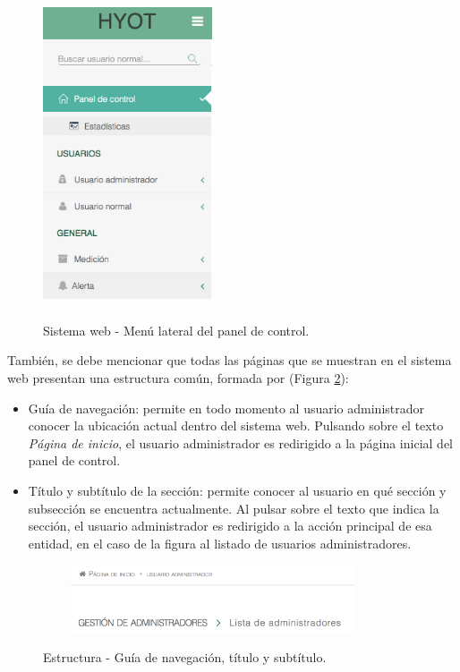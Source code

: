 \documentclass[12pt,a4paper, twoside]{report}
\begin{document}
\begin{itemize}
\begin{itemize}
			 	\begin{figure}[!ht]   
					\caption{Sistema web - Menú lateral del panel de control.} 
					\begin{center} 
	 					\includegraphics[width=5cm, height=9cm]{Images/userGuide/web/adminMenuLateral} \\
						\label{fig:web_adminMenuLateral} 
					\end{center}  	
				\end{figure}
			\end{itemize}
	\end{itemize}
	
	
	También, se debe mencionar que todas las páginas que se muestran en el sistema web presentan una estructura común, formada por (Figura \ref{fig:web_breadcrumb}): 
	
	\begin{itemize}
		\item Guía de navegación: permite en todo momento al usuario administrador conocer la ubicación actual dentro del sistema web. Pulsando sobre el texto \textit{Página de inicio}, el usuario administrador es redirigido a la página inicial del panel de control.
		\item Título y subtítulo de la sección: permite conocer al usuario en qué sección y subsección se encuentra actualmente. Al pulsar sobre el texto que indica la sección, el usuario administrador es redirigido a la acción principal de esa entidad, en el caso de la figura al listado de usuarios administradores.
	\end{itemize}
	
			\begin{figure}[!ht]   
				\caption{Estructura - Guía de navegación, título y subtítulo.} 
				\begin{center} 
 					\includegraphics[width=10cm, height=2cm]{Images/userGuide/web/breadcrumb} \\	
 					\label{fig:web_breadcrumb} 
				\end{center}  	
			\end{figure}
		
\end{document}
